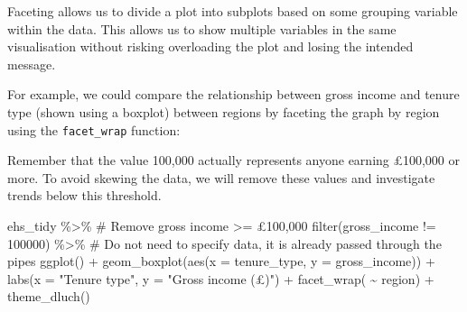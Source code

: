 \documentclass[
  letterpaper,
  DIV=11,
  numbers=noendperiod]{scrreprt}
\newenvironment{Shaded}{\begin{snugshade}}{\end{snugshade}}
\newcommand{\AttributeTok}[1]{\textcolor[rgb]{0.40,0.45,0.13}{#1}}
\newcommand{\CommentTok}[1]{\textcolor[rgb]{0.37,0.37,0.37}{#1}}
\newcommand{\DecValTok}[1]{\textcolor[rgb]{0.68,0.00,0.00}{#1}}
\newcommand{\FunctionTok}[1]{\textcolor[rgb]{0.28,0.35,0.67}{#1}}
\newcommand{\NormalTok}[1]{\textcolor[rgb]{0.00,0.23,0.31}{#1}}
\newcommand{\SpecialCharTok}[1]{\textcolor[rgb]{0.37,0.37,0.37}{#1}}
\newcommand{\StringTok}[1]{\textcolor[rgb]{0.13,0.47,0.30}{#1}}
\begin{document}
Faceting allows us to divide a plot into subplots based on some grouping
variable within the data. This allows us to show multiple variables in
the same visualisation without risking overloading the plot and losing
the intended message.

For example, we could compare the relationship between gross income and
tenure type (shown using a boxplot) between regions by faceting the
graph by region using the \texttt{facet\_wrap} function:

\begin{tcolorbox}[enhanced jigsaw, bottomrule=.15mm, left=2mm, leftrule=.75mm, bottomtitle=1mm, coltitle=black, colbacktitle=quarto-callout-warning-color!10!white, toptitle=1mm, arc=.35mm, breakable, title=\textcolor{quarto-callout-warning-color}{\faExclamationTriangle}\hspace{0.5em}{Warning}, rightrule=.15mm, toprule=.15mm, opacityback=0, opacitybacktitle=0.6, titlerule=0mm, colback=white, colframe=quarto-callout-warning-color-frame]

Remember that the value 100,000 actually represents anyone earning
£100,000 or more. To avoid skewing the data, we will remove these values
and investigate trends below this threshold.

\end{tcolorbox}

\begin{Shaded}
\begin{Highlighting}[]
\NormalTok{ehs\_tidy }\SpecialCharTok{\%\textgreater{}\%} 
  \CommentTok{\# Remove gross income \textgreater{}= £100,000}
  \FunctionTok{filter}\NormalTok{(gross\_income }\SpecialCharTok{!=} \DecValTok{100000}\NormalTok{) }\SpecialCharTok{\%\textgreater{}\%} 
  \CommentTok{\# Do not need to specify data, it is already passed through the pipes}
  \FunctionTok{ggplot}\NormalTok{() }\SpecialCharTok{+}
  \FunctionTok{geom\_boxplot}\NormalTok{(}\FunctionTok{aes}\NormalTok{(}\AttributeTok{x =}\NormalTok{ tenure\_type, }\AttributeTok{y =}\NormalTok{ gross\_income)) }\SpecialCharTok{+}
  \FunctionTok{labs}\NormalTok{(}\AttributeTok{x =} \StringTok{"Tenure type"}\NormalTok{, }\AttributeTok{y =} \StringTok{"Gross income (£)"}\NormalTok{) }\SpecialCharTok{+}
  \FunctionTok{facet\_wrap}\NormalTok{( }\SpecialCharTok{\textasciitilde{}}\NormalTok{ region) }\SpecialCharTok{+}
  \FunctionTok{theme\_dluch}\NormalTok{()}
\end{Highlighting}
\end{Shaded}
\end{document}
